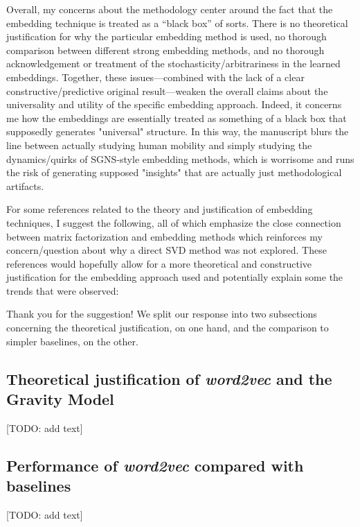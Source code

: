 \documentclass[12pt,a4paper]{article}
\newcommand{\todo}[1]{{\leavevmode\color{orange}[TODO: #1]}}
\newcommand{\response}[1]{{\leavevmode\noindent #1}}
\begin{document}
{Overall, my concerns about the methodology center around the fact that the embedding technique is treated as a “black box” of sorts. There is no theoretical justification for why the particular embedding method is used, no thorough comparison between different strong embedding methods, and no thorough acknowledgement or treatment of the stochasticity/arbitrariness in the learned embeddings. Together, these issues—combined with the lack of a clear constructive/predictive original result—weaken the overall claims about the universality and utility of the specific embedding approach. Indeed, it concerns me how the embeddings are essentially treated as something of a black box that supposedly generates "universal" structure. In this way, the manuscript blurs the line between actually studying human mobility and simply studying the dynamics/quirks of SGNS-style embedding methods, which is worrisome and runs the risk of generating supposed "insights" that are actually just
methodological artifacts.

For some references related to the theory and justification of embedding techniques, I suggest the following, all of which emphasize the close connection between matrix factorization and embedding methods which reinforces my concern/question about why a direct SVD method was not explored. These references would hopefully allow for a more theoretical and constructive justification for the embedding approach used and potentially explain some the trends that were observed:



}

\response{%
Thank you for the suggestion! 
We split our response into two subsections concerning the theoretical justification, on one hand, and the comparison to simpler baselines, on the other. 

\subsection*{Theoretical justification of \textit{word2vec} and the Gravity Model} 
\todo {add text}



\subsection*{Performance of \textit{word2vec} compared with baselines}
\todo{add text}



}
\end{document}
